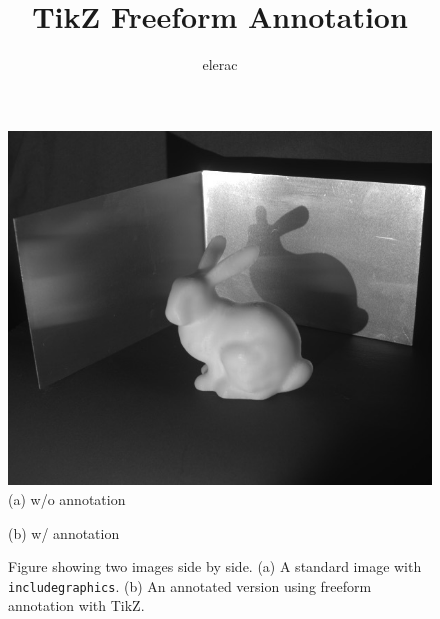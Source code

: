 \documentclass{article}
\title{TikZ Freeform Annotation}
\author{elerac}
\date{}
\begin{document}
\maketitle

\begin{figure}[tbh]
    \centering
    \begin{minipage}{0.5\hsize}
        \centering
        \includegraphics[width=0.98\hsize]{figures/bunny.jpg}
        (a) w/o annotation
    \end{minipage}%
    \begin{minipage}{0.5\hsize}
        \centering
        \scalebox{0.98}{}
        (b) w/ annotation
    \end{minipage}%
    \caption{Figure showing two images side by side. (a) A standard image with \texttt{includegraphics}. (b) An annotated version using freeform annotation with TikZ.}
\end{figure}
\end{document}
